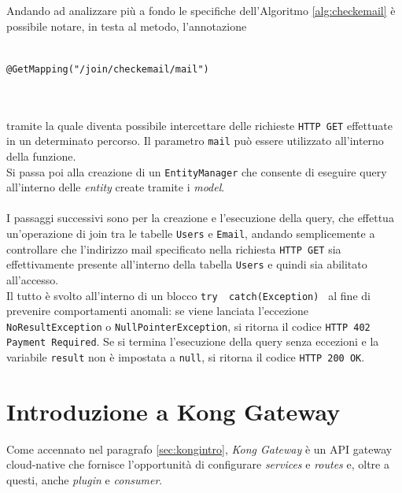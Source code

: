 Andando ad analizzare più a fondo le specifiche dell'Algoritmo \ref{alg:checkemail} è possibile notare, in testa al metodo, l'annotazione\\ \\
\centerline{\texttt{@GetMapping("/join/checkemail/{mail}")}} \\ \\
tramite la quale diventa possibile intercettare delle richieste \texttt{HTTP GET} effettuate in un determinato percorso. Il parametro \texttt{{mail}} può essere
utilizzato all'interno della funzione.\\
Si passa poi alla creazione di un \texttt{EntityManager} che consente di eseguire query all'interno delle \emph{entity} create tramite i \emph{model}.\\ \\
I passaggi successivi sono per la creazione e l'esecuzione della query, che effettua un'operazione di join tra le tabelle \texttt{Users} e \texttt{Email}, andando
semplicemente a controllare che l'indirizzo mail specificato nella richiesta \texttt{HTTP GET} sia effettivamente presente all'interno della tabella \texttt{Users} e
quindi sia abilitato all'accesso.\\
Il tutto è svolto all'interno di un blocco \texttt{try{ } catch(Exception){ }} al fine di prevenire comportamenti anomali: se viene lanciata l'eccezione\\
\texttt{NoResultException} o \texttt{NullPointerException}, si ritorna il codice \texttt{HTTP 402 Payment Required}.
Se si termina l'esecuzione della query senza eccezioni e la variabile \texttt{result} non è impostata a \texttt{null}, si ritorna il codice \texttt{HTTP 200 OK}.



\section{Introduzione a Kong Gateway}\label{sec:kongprog}
Come accennato nel paragrafo \ref{sec:kongintro}, \emph{Kong Gateway} è un API gateway cloud-native che fornisce l'opportunità di configurare \emph{services} e \emph{routes} e, oltre a questi, anche \emph{plugin} e \emph{consumer}.
